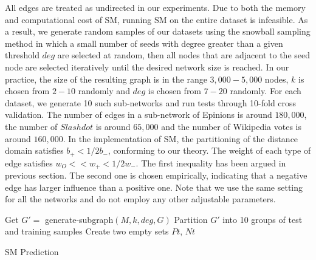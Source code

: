 All edges are treated as undirected in our experiments. Due to both
the memory and computational cost of SM, running SM on the entire
dataset is infeasible. As a result, we generate random samples of our
datasets using the snowball sampling method in which a small number of
seeds with degree greater than a given threshold $deg$ are selected at
random, then all nodes that are adjacent to the seed node are selected
iteratively until the desired network size is reached.
In our practice, the size of the resulting graph is in the range
$3,000-5,000$ nodes, $k$ is chosen from $2-10$ randomly and $deg$ is
chosen from $7-20$ randomly. For each dataset, we generate 10 such
sub-networks and run tests through 10-fold cross validation. The
number of edges in a sub-network of Epinions is around $180,000$, the
number of $Slashdot$ is around $65,000$ and the number of Wikipedia
votes is around $160,000$. In the implementation of SM, the
partitioning of the distance domain satisfies $b_{+} < 1/2b_{-}$,
conforming to our theory. The weight of each type of edge satisfies
$w_{O}<<w_{+}<1/2w_{-}$. The first inequality has been argued in
previous section. The second one is chosen empirically, indicating
that a negative edge has larger influence than a positive one. Note
that we use the same setting for all the networks and do not employ
any other adjustable parameters.
\begin{algorithm}
 Get $G'=$ generate-subgraph$(M, k, deg, G)$\;
 Partition $G'$ into 10 groups of test and training samples\;
 Create two empty sets $Pt$, $Nt$\;
 \caption{SM Prediction}
\end{algorithm}

